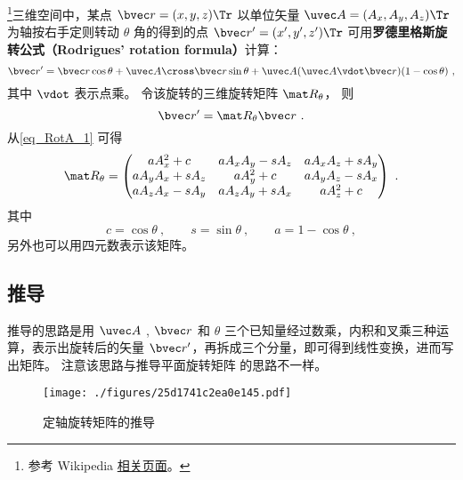 

\footnote{参考 Wikipedia \href{https://en.wikipedia.org/wiki/Rodrigues'_rotation_formula}{相关页面}。}三维空间中，某点 $\bvec r=(x,y,z)\Tr$ 以单位矢量 $\uvec A=(A_x, A_y, A_z)\Tr$ 为轴按右手定则转动 $\theta$ 角的得到的点 $\bvec r'=(x',y',z')\Tr$ 可用\textbf{罗德里格斯旋转公式（Rodrigues' rotation formula）}计算：
\begin{equation}\label{eq_RotA_1}
\bvec r' = \bvec r \cos\theta + \uvec A \cross \bvec r \sin\theta + \uvec A (\uvec A \vdot \bvec r) (1 - \cos\theta)~,
\end{equation}
其中 $\vdot$ 表示点乘。 令该旋转的三维旋转矩阵 $\mat R_\theta$， 则
\begin{equation}\label{eq_RotA_2}
\bvec r' = \mat R_\theta \bvec r~.
\end{equation}
从\autoref{eq_RotA_1} 可得
\begin{equation}\label{eq_RotA_3}
\mat R_\theta =
\begin{pmatrix}
a A_x^2 + c & a A_x A_y - s A_z & a A_x A_z + s A_y\\
a A_y A_x + s A_z & a A_y^2 + c & a A_y A_z - s A_x\\
a A_z A_x - s A_y & a A_z A_y + s A_x & a A_z^2 + c
\end{pmatrix}~.\end{equation}
其中
\begin{equation}
c = \cos\theta ~,\qquad s = \sin\theta~, \qquad a = 1 - \cos\theta~,
\end{equation}
另外也可以用四元数表示该矩阵。

\subsection{推导}
推导的思路是用 $\uvec A$ , $\bvec r$ 和 $\theta $ 三个已知量经过数乘，内积和叉乘三种运算，表示出旋转后的矢量 $\bvec r'$，再拆成三个分量，即可得到线性变换，进而写出矩阵。 注意该思路与推导平面旋转矩阵 的思路不一样。
\begin{figure}[ht]
\centering
\texttt{[image: ./figures/25d1741c2ea0e145.pdf]}
\caption{定轴旋转矩阵的推导} \label{fig_RotA_1}
\end{figure} 


